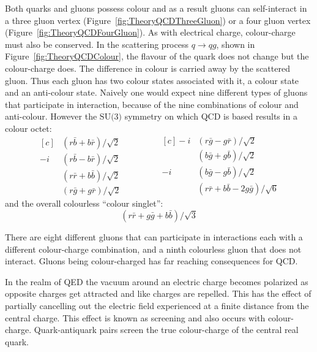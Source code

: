 Both quarks and gluons possess colour and as a result gluons can self-interact in a three gluon vertex (Figure~\ref{fig:TheoryQCDThreeGluon}) or a four gluon vertex (Figure~\ref{fig:TheoryQCDFourGluon}). As with electrical charge, colour-charge must also be conserved. In the scattering process $q\rightarrow qg$, shown in Figure~\ref{fig:TheoryQCDColour}, the flavour of the quark does not change but the colour-charge does. The difference in colour is carried away by the scattered gluon. Thus each gluon has two colour states associated with it, a colour state and an anti-colour state. Naively one would expect nine different types of gluons that participate in interaction, because of the nine combinations of colour and anti-colour. However the $\textrm{SU(3)}$ symmetry on which QCD is based results in a colour octet:
%
\begin{equation}
  \begin{aligned}[c]
    &(r\bar{b}+b\bar{r})/\sqrt{2} \\
    -i&(r\bar{b}-b\bar{r})/\sqrt{2} \\
    &(r\bar{r}+b\bar{b})/\sqrt{2} \\
    &(r\bar{g}+g\bar{r})/\sqrt{2}
  \end{aligned}
  \qquad\qquad
  \begin{aligned}[c]
    -i&(r\bar{g}-g\bar{r})/\sqrt{2} \\
    &(b\bar{g}+g\bar{b})/\sqrt{2} \\
    -i&(b\bar{g}-g\bar{b})/\sqrt{2} \\
    &(r\bar{r}+b\bar{b}-2g\bar{g})/\sqrt{6}
  \end{aligned}
\end{equation}
%
and the overall colourless ``colour singlet'':
%
\begin{equation}
  (r\bar{r} + g\bar{g} + b\bar{b})/\sqrt{3}
\end{equation}

There are eight different gluons that can participate in interactions each with a different colour-charge combination, and a ninth colourless gluon that does not interact. Gluons being colour-charged has far reaching consequences for QCD\@.

In the realm of QED the vacuum around an electric charge becomes polarized as opposite charges get attracted and like charges are repelled. This has the effect of partially cancelling out the electric field experienced at a finite distance from the central charge. This effect is known as screening and also occurs with colour-charge. Quark-antiquark pairs screen the true colour-charge of the central real quark.


